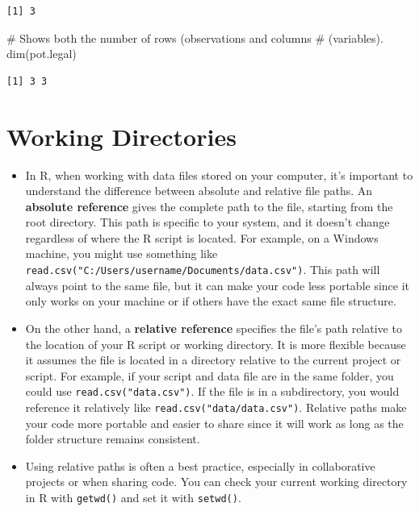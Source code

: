 \documentclass[
  letterpaper,
  DIV=11,
  numbers=noendperiod]{scrreprt}
\newenvironment{Shaded}{\begin{snugshade}}{\end{snugshade}}
\newcommand{\CommentTok}[1]{\textcolor[rgb]{0.37,0.37,0.37}{#1}}
\newcommand{\FunctionTok}[1]{\textcolor[rgb]{0.28,0.35,0.67}{#1}}
\newcommand{\NormalTok}[1]{\textcolor[rgb]{0.00,0.23,0.31}{#1}}
\begin{document}
\begin{verbatim}
[1] 3
\end{verbatim}

\begin{Shaded}
\begin{Highlighting}[]
\CommentTok{\# Shows both the number of rows (observations and columns}
\CommentTok{\# (variables).}
\FunctionTok{dim}\NormalTok{(pot.legal)}
\end{Highlighting}
\end{Shaded}

\begin{verbatim}
[1] 3 3
\end{verbatim}


\chapter{Working Directories}\label{working-directories}

\begin{itemize}
\item
  In R, when working with data files stored on your computer, it's
  important to understand the difference between absolute and relative
  file paths. An \textbf{absolute reference} gives the complete path to
  the file, starting from the root directory. This path is specific to
  your system, and it doesn't change regardless of where the R script is
  located. For example, on a Windows machine, you might use something
  like \texttt{read.csv("C:/Users/username/Documents/data.csv")}. This
  path will always point to the same file, but it can make your code
  less portable since it only works on your machine or if others have
  the exact same file structure.
\item
  On the other hand, a \textbf{relative reference} specifies the file's
  path relative to the location of your R script or working directory.
  It is more flexible because it assumes the file is located in a
  directory relative to the current project or script. For example, if
  your script and data file are in the same folder, you could use
  \texttt{read.csv("data.csv")}. If the file is in a subdirectory, you
  would reference it relatively like \texttt{read.csv("data/data.csv")}.
  Relative paths make your code more portable and easier to share since
  it will work as long as the folder structure remains consistent.
\item
  Using relative paths is often a best practice, especially in
  collaborative projects or when sharing code. You can check your
  current working directory in R with \texttt{getwd()} and set it with
  \texttt{setwd()}.
\end{itemize}
\end{document}
